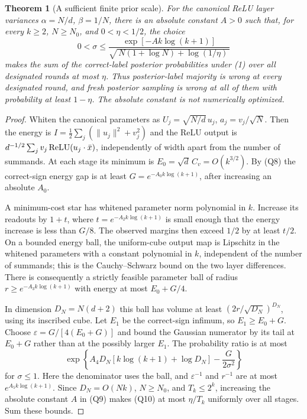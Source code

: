 \documentclass[11pt]{article}
\newtheorem{theorem}{Theorem}\newtheorem{lemma}[theorem]{Lemma}
\begin{document}
\begin{theorem}[A sufficient finite prior scale]\label{thm:finite-scale}
For the canonical ReLU layer variances
$\alpha=N/d$, $\beta=1/N$, there is an absolute constant $A>0$
such that, for every $k\ge2$, $N\ge N_0$, and $0<\eta<1/2$, the choice
\[
 0<\sigma\le
 \frac{\exp[-A k\log(k+1)]}
      {\sqrt{\,N(1+\log N)+\log(1/\eta)\,}}              \tag{Q9}
\]
makes the sum of the correct-label posterior probabilities under (1)
over all designated rounds at most $\eta$. Thus posterior-label majority is
wrong at every designated round, and fresh posterior sampling is wrong
at all of them with probability at least $1-\eta$.
The absolute constant is not numerically optimized.
\end{theorem}
\begin{proof}
Whiten the canonical parameters as
$U_j=\sqrt{N/d}\,u_j$, $a_j=v_j/\sqrt N$.
Then the energy is $I=\frac12\sum_j(\|u_j\|^2+v_j^2)$ and the
ReLU output is $d^{-1/2}\sum_jv_j\operatorname{ReLU}(u_j\cdot\bar x)$, independently
of width apart from the number of summands.
At each stage its minimum is $E_0=\sqrt d\,C_v=O(k^{3/2})$.
By (Q8) the correct-sign energy gap is at least
$G=e^{-A_0k\log(k+1)}$, after increasing an absolute $A_0$.

A minimum-cost star has whitened parameter norm polynomial in $k$.
Increase its readouts by $1+t$, where
$t=e^{-A_2k\log(k+1)}$ is small enough that the energy increase is
less than $G/8$. The observed margins then exceed $1/2$ by at least
$t/2$. On a bounded energy ball, the uniform-cube output map is
Lipschitz in the whitened parameters with a constant polynomial in $k$,
independent of the number of summands; this is the Cauchy--Schwarz bound
on the two layer differences. There is consequently a strictly feasible
parameter ball of radius $r\ge e^{-A_3k\log(k+1)}$ with energy at most
$E_0+G/4$.

In dimension $D_N=N(d+2)$ this ball has volume at least
$(2r/\sqrt{D_N})^{D_N}$, using its inscribed cube.
Let $E_1$ be the correct-sign infimum, so $E_1\ge E_0+G$.
Choose $\varepsilon=G/[4(E_0+G)]$ and bound the Gaussian numerator
by its tail at $E_0+G$ rather than at the possibly larger $E_1$.
The probability ratio is at most
\[
 \exp\left\{A_4D_N[k\log(k+1)+\log D_N]
                                  -\frac{G}{2\sigma^2}\right\}
                                                               \tag{Q10}
\]
for $\sigma\le1$. Here the denominator uses the ball, and
$\varepsilon^{-1}$ and $r^{-1}$ are at most
$e^{A_5k\log(k+1)}$.
Since $D_N=O(Nk)$, $N\ge N_0$, and $T_k\le2^k$, increasing the
absolute constant $A$ in (Q9) makes (Q10) at most $\eta/T_k$
uniformly over all stages. Sum these bounds.
\end{proof}
\end{document}
